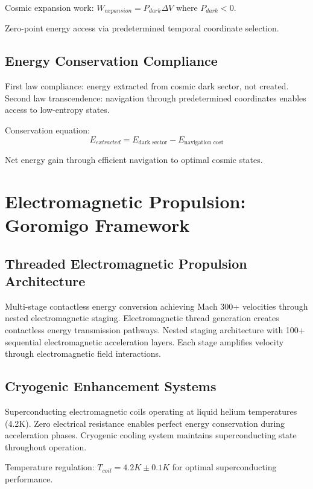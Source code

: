 \documentclass[12pt,a4paper]{article}
\begin{document}
Cosmic expansion work: $W_{expansion} = P_{dark} \Delta V$ where $P_{dark} < 0$.

Zero-point energy access via predetermined temporal coordinate selection.

\subsection{Energy Conservation Compliance}

First law compliance: energy extracted from cosmic dark sector, not created.
Second law transcendence: navigation through predetermined coordinates enables access to low-entropy states.

Conservation equation:
\begin{equation}
E_{extracted} = E_{\text{dark sector}} - E_{\text{navigation cost}}
\end{equation}

Net energy gain through efficient navigation to optimal cosmic states.

\section{Electromagnetic Propulsion: Goromigo Framework}

\subsection{Threaded Electromagnetic Propulsion Architecture}

Multi-stage contactless energy conversion achieving Mach 300+ velocities through nested electromagnetic staging. Electromagnetic thread generation creates contactless energy transmission pathways. Nested staging architecture with 100+ sequential electromagnetic acceleration layers. Each stage amplifies velocity through electromagnetic field interactions.

\subsection{Cryogenic Enhancement Systems}

Superconducting electromagnetic coils operating at liquid helium temperatures (4.2K). Zero electrical resistance enables perfect energy conservation during acceleration phases. Cryogenic cooling system maintains superconducting state throughout operation.

Temperature regulation: $T_{coil} = 4.2K \pm 0.1K$ for optimal superconducting performance.
\end{document}
